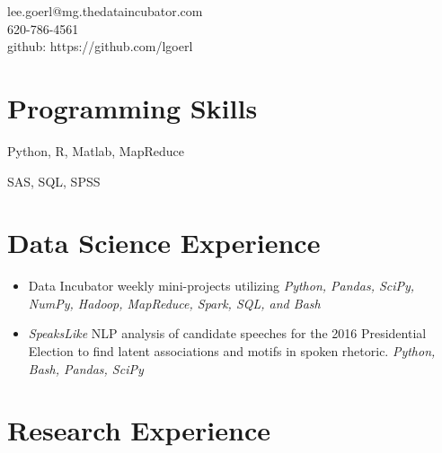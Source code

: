 \documentclass[a4paper,10pt,notitlepage]{article}
\begin{document}
\begin{multicols}{2}{
\noindent %

\noindent lee.goerl@mg.thedataincubator.com\\
620-786-4561\\
github: https://github.com/lgoerl
}
\end{multicols}
\vspace{-10pt}\section*{Programming Skills}
	\begin{description}
	\vspace{-5pt} \item[Primary Languages and Frameworks:] Python, R, Matlab, MapReduce
	\item[Secondary Languages and Frameworks:] SAS, SQL, SPSS
	\end{description}

\section*{Data Science Experience}

	\begin{itemize}
		\vspace{-5pt}\item Data Incubator weekly mini-projects utilizing \emph{Python, Pandas, SciPy, NumPy, Hadoop, MapReduce, Spark, SQL, and Bash}
		\vspace{-5pt}\item \emph{SpeaksLike} NLP analysis of candidate speeches for the 2016 Presidential Election to find latent associations and motifs in spoken rhetoric. \emph{Python, Bash, Pandas, SciPy}
	\end{itemize}


\section*{Research Experience}
\end{document}
